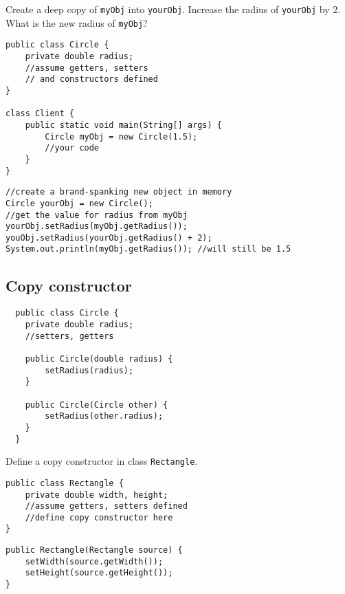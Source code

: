   
\begin{exercise}
Create a deep copy of \texttt{myObj} into \texttt{yourObj}. Increase the radius of \texttt{yourObj} by 2. What is the new radius of \texttt{myObj}?

\begin{lstlisting}[frame=single,style=buggy]
public class Circle {
	private double radius;
	//assume getters, setters
	// and constructors defined
}

class Client {
	public static void main(String[] args) {
		Circle myObj = new Circle(1.5);
		//your code
	}
}
\end{lstlisting}  	
\end{exercise}

\begin{answer} \begin{lstlisting}
//create a brand-spanking new object in memory
Circle yourObj = new Circle(); 
//get the value for radius from myObj
yourObj.setRadius(myObj.getRadius());
youObj.setRadius(yourObj.getRadius() + 2);
System.out.println(myObj.getRadius()); //will still be 1.5
\end{lstlisting} \end{answer}

\clearpage
\subsection{Copy constructor}
  \begin{lstlisting}
  public class Circle {
  	private double radius;
  	//setters, getters
 
  	public Circle(double radius) {
		setRadius(radius);
  	}
	
	public Circle(Circle other) {
		setRadius(other.radius);
  	}
  }
  \end{lstlisting}   
  
\begin{exercise}
Define a copy constructor in class \texttt{Rectangle}. 

\begin{lstlisting}[frame=single,style=buggy]
public class Rectangle {
	private double width, height;
	//assume getters, setters defined
	//define copy constructor here
}
\end{lstlisting}  	
\end{exercise} 
\begin{answer} \begin{lstlisting}
public Rectangle(Rectangle source) {
	setWidth(source.getWidth());
	setHeight(source.getHeight());
}
\end{lstlisting} \end{answer}

